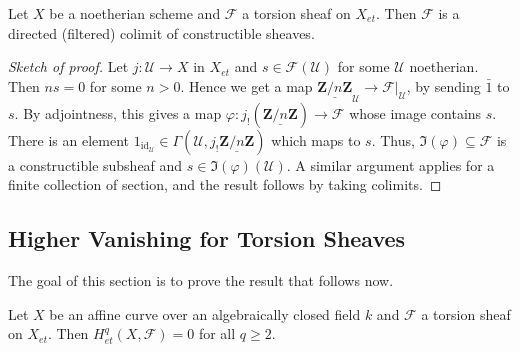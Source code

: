 \begin{lemma} \label{lem:TosionSheavesAreColimitsOfConstructibleOnes}
Let $X$ be a noetherian scheme and $\mathcal{F}$ a torsion sheaf on $X_{et}$. Then $\mathcal{F}$ is a directed (filtered) colimit of constructible sheaves.
\end{lemma}

\begin{proof}[Sketch of proof]
Let $j: \mathcal{U} \to X$ in $X_{et}$ and $s\in \mathcal{F}(\mathcal{U})$ for some $\mathcal{U}$ noetherian. Then $ns = 0$ for some $n>0$. Hence we get a map $\underline{\mathbf{Z}/n\mathbf{Z}}_\mathcal{U}\to \mathcal{F}|_\mathcal{U}$, by sending $\bar 1$ to $s$. By adjointness, this gives a map $\varphi: j_!(\underline{\mathbf{Z}/n\mathbf{Z}}) \to \mathcal{F}$ whose image contains $s$. There is an element $1_{\text{id}_\mathcal{U}} \in \Gamma(\mathcal{U}, j_!\underline{\mathbf{Z}/n\mathbf{Z}})$ which maps to $s$. Thus, $\Im(\varphi) \subseteq \mathcal{F}$ is a constructible subsheaf and $s\in \Im(\varphi)(\mathcal{U})$. A similar argument applies for a finite collection of section, and the result follows by taking colimits.
\end{proof}

\subsection{Higher Vanishing for Torsion Sheaves}
\label{subsection:HigherVanishingForTorsionSheaves}

The goal of this section is to prove the result that follows now.

\begin{theorem} \label{thm:VanishingForAffineCurves}
Let $X$ be an affine curve over an algebraically closed field $k$ and $\mathcal{F}$ a torsion sheaf on $X_{et}$. Then $H_{et}^q(X, \mathcal{F}) = 0$ for all $q\geq 2$. 
\end{theorem}

